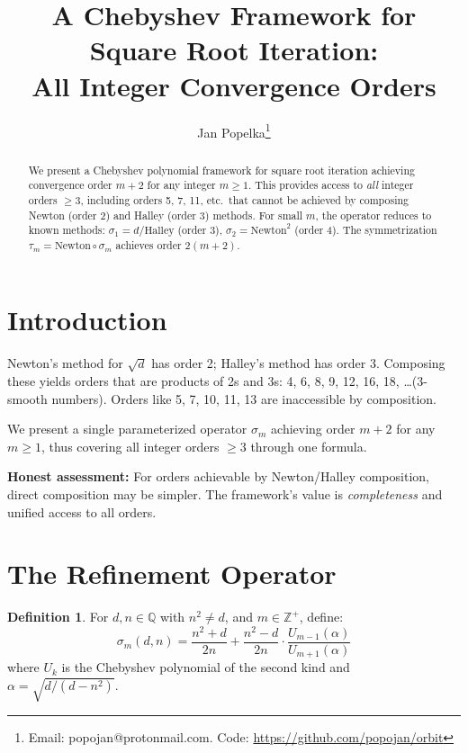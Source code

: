 \documentclass[11pt]{article}
\title{A Chebyshev Framework for Square Root Iteration:\\All Integer Convergence Orders}
\author{Jan Popelka\thanks{Email: popojan@protonmail.com. Code: \url{https://github.com/popojan/orbit}}}
\date{}
\theoremstyle{definition}
\newtheorem{definition}[theorem]{Definition}
\theoremstyle{remark}
\begin{document}
\maketitle

\begin{abstract}
We present a Chebyshev polynomial framework for square root iteration achieving
convergence order $m+2$ for any integer $m \geq 1$. This provides access to
\emph{all} integer orders $\geq 3$, including orders 5, 7, 11, etc.\ that cannot
be achieved by composing Newton (order 2) and Halley (order 3) methods. For
small $m$, the operator reduces to known methods: $\sigma_1 = d/\text{Halley}$
(order 3), $\sigma_2 = \text{Newton}^2$ (order 4). The symmetrization
$\tau_m = \text{Newton} \circ \sigma_m$ achieves order $2(m+2)$.
\end{abstract}

\section{Introduction}

Newton's method for $\sqrt{d}$ has order 2; Halley's method has order 3.
Composing these yields orders that are products of 2s and 3s: 4, 6, 8, 9, 12,
16, 18, \ldots (3-smooth numbers). Orders like 5, 7, 10, 11, 13 are inaccessible
by composition.

We present a single parameterized operator $\sigma_m$ achieving order $m+2$ for
any $m \geq 1$, thus covering all integer orders $\geq 3$ through one formula.

\textbf{Honest assessment:} For orders achievable by Newton/Halley composition,
direct composition may be simpler. The framework's value is \emph{completeness}
and unified access to all orders.

\section{The Refinement Operator}

\begin{definition}
For $d, n \in \mathbb{Q}$ with $n^2 \neq d$, and $m \in \mathbb{Z}^+$, define:
\begin{equation}
\sigma_m(d, n) = \frac{n^2 + d}{2n} + \frac{n^2 - d}{2n} \cdot \frac{U_{m-1}(\alpha)}{U_{m+1}(\alpha)}
\end{equation}
where $U_k$ is the Chebyshev polynomial of the second kind and
$\alpha = \sqrt{d/(d-n^2)}$.
\end{definition}
\end{document}
